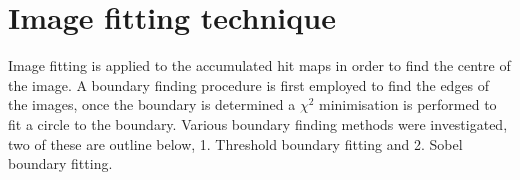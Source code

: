 \section{Image fitting technique}
\label{section: Fitting Procedure}

Image fitting is applied to the accumulated hit maps in order to find the centre of the image. A boundary finding procedure is first employed to find the edges of the images, once the boundary is determined a $\chi^2$ minimisation is performed to fit a circle to the boundary. Various boundary finding methods were investigated, two of these are outline below, 1. Threshold boundary fitting and 2. Sobel boundary fitting.





